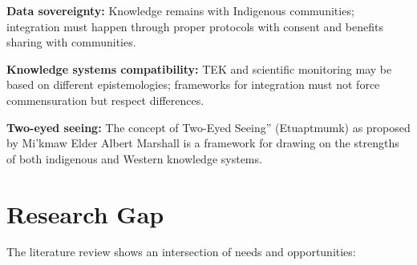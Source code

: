\documentclass[12pt,oneside]{book}
\begin{document}
\textbf{Data sovereignty:} Knowledge remains with Indigenous communities; integration must happen through proper protocols with consent and benefits sharing with communities.

\textbf{Knowledge systems compatibility:} TEK and scientific monitoring may be based on different epistemologies; frameworks for integration must not force commensuration but respect differences.

\textbf{Two-eyed seeing:} The concept of Two-Eyed Seeing'' (Etuaptmumk) as proposed by Mi'kmaw Elder Albert Marshall is a framework for drawing on the strengths of both indigenous and Western knowledge systems.

\section{Research Gap}
\label{sec:research-gap}

The literature review shows an intersection of needs and opportunities:
\end{document}
